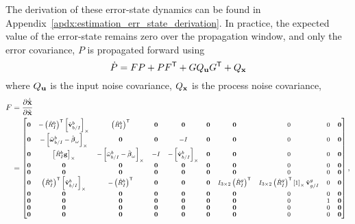 The derivation of these error-state dynamics can be found in
Appendix~\ref{apdx:estimation_err_state_derivation}. In practice, the expected
value of the error-state remains zero over the propagation window, and only the
error covariance, $P$ is propagated forward using
\begin{equation}
  \dot{P} = FP + PF^{\mathsf{T}} + G Q_{\boldsymbol{\mathrm{u}}} G^{\mathsf{T}} + Q_{\boldsymbol{\mathrm{x}}}
\end{equation}
where $Q_{\boldsymbol{\mathrm{u}}}$ is the input noise covariance, $Q_{\boldsymbol{\mathrm{x}}}$ is the
process noise covariance, 
\begin{align}
  F &= \frac{ \partial \dot{\tilde{\x}} }{ \partial \tilde{\x} } \\
    &=
    \scriptsize
    \begin{bmatrix}
      \vect{0} & - \left( \hat{R}_I^b \right)^\transpose
      \skewmat{\hat{\vect{v}}_{b/I}^b} & \left( \hat{R}_I^b \right)^\transpose &
      \vect{0} & \vect{0} & \vect{0} & \vect{0}
               & 0 & 0 & \vect{0} \\
      \vect{0} & -\skewmat{ \bar{\vect{\omega}}_{b/I}^b
      - \hat{\vect{\beta}}_\omega} & \vect{0} & \vect{0} & -I & \vect{0} & \vect{0}
               & 0 & 0 & \vect{0} \\
      \vect{0} & \skewmat{ \hat{R}_I^b \vect{g} } &
      -\skewmat{ \bar{\omega}_{b/I}^b - \hat{\vect{\beta}}_\omega } & -I &
      -\skewmat{ \hat{\vect{v}}_{b/I}^b } & \vect{0} & \vect{0}
               & 0 & 0 & \vect{0} \\
      \vect{0} & \vect{0} & \vect{0} & \vect{0} & \vect{0} & \vect{0} & \vect{0}
               & 0 & 0 & \vect{0} \\
      \vect{0} & \vect{0} & \vect{0} & \vect{0} & \vect{0} & \vect{0} & \vect{0}
               & 0 & 0 & \vect{0} \\
      \vect{0} & \left( \hat{R}_{I}^{b} \right)^\transpose
      \skewmat{ \hat{\vect{v}}_{b/I}^{b} } & 
      -\left( \hat{R}_{I}^{b} \right)^\transpose & \vect{0} & \vect{0} & \vect{0} & 
      I_{3 \times 2} \left( \hat{R}_{I}^{g} \right)^\transpose
               & I_{3 \times 2} \left( \hat{R}_{I}^{g} \right)^\transpose
               \skewmat{ 1 } \hat{\vect{v}}_{g/I}^g
               & 0 & \vect{0} \\
      \vect{0} & \vect{0} & \vect{0} & \vect{0} & \vect{0} & \vect{0} & \vect{0}
               & 0 & 0 & \vect{0} \\
      \vect{0} & \vect{0} & \vect{0} & \vect{0} & \vect{0} & \vect{0} & \vect{0}
               & 0 & 1 & \vect{0} \\
      \vect{0} & \vect{0} & \vect{0} & \vect{0} & \vect{0} & \vect{0} & \vect{0}
               & 0 & 0 & \vect{0} \\
      \vect{0} & \vect{0} & \vect{0} & \vect{0} & \vect{0} & \vect{0} & \vect{0}
               & 0 & 0 & \vect{0}
    \end{bmatrix},
\end{align}
